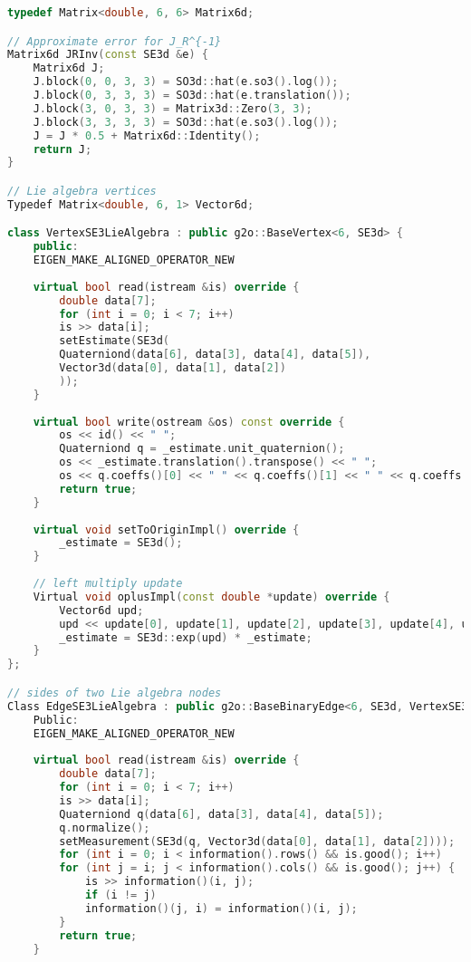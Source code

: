 \clearpage
\begin{lstlisting}[language=c++,caption=slambook2/ch10/pose\_graph\_g2o\_lie\_algebra.cpp（片段）]
typedef Matrix<double, 6, 6> Matrix6d;

// Approximate error for J_R^{-1}
Matrix6d JRInv(const SE3d &e) {
    Matrix6d J;
    J.block(0, 0, 3, 3) = SO3d::hat(e.so3().log());
    J.block(0, 3, 3, 3) = SO3d::hat(e.translation());
    J.block(3, 0, 3, 3) = Matrix3d::Zero(3, 3);
    J.block(3, 3, 3, 3) = SO3d::hat(e.so3().log());
    J = J * 0.5 + Matrix6d::Identity();
    return J;
}

// Lie algebra vertices
Typedef Matrix<double, 6, 1> Vector6d;

class VertexSE3LieAlgebra : public g2o::BaseVertex<6, SE3d> {
    public:
    EIGEN_MAKE_ALIGNED_OPERATOR_NEW
    
    virtual bool read(istream &is) override {
        double data[7];
        for (int i = 0; i < 7; i++)
        is >> data[i];
        setEstimate(SE3d(
        Quaterniond(data[6], data[3], data[4], data[5]),
        Vector3d(data[0], data[1], data[2])
        ));
    }
    
    virtual bool write(ostream &os) const override {
        os << id() << " ";
        Quaterniond q = _estimate.unit_quaternion();
        os << _estimate.translation().transpose() << " ";
        os << q.coeffs()[0] << " " << q.coeffs()[1] << " " << q.coeffs()[2] << " " << q.coeffs()[3] << endl;
        return true;
    }
    
    virtual void setToOriginImpl() override {
        _estimate = SE3d();
    }
    
    // left multiply update
    Virtual void oplusImpl(const double *update) override {
        Vector6d upd;
        upd << update[0], update[1], update[2], update[3], update[4], update[5];
        _estimate = SE3d::exp(upd) * _estimate;
    }
};

// sides of two Lie algebra nodes
Class EdgeSE3LieAlgebra : public g2o::BaseBinaryEdge<6, SE3d, VertexSE3LieAlgebra, VertexSE3LieAlgebra> {
    Public:
    EIGEN_MAKE_ALIGNED_OPERATOR_NEW
    
    virtual bool read(istream &is) override {
        double data[7];
        for (int i = 0; i < 7; i++)
        is >> data[i];
        Quaterniond q(data[6], data[3], data[4], data[5]);
        q.normalize();
        setMeasurement(SE3d(q, Vector3d(data[0], data[1], data[2])));
        for (int i = 0; i < information().rows() && is.good(); i++)
        for (int j = i; j < information().cols() && is.good(); j++) {
            is >> information()(i, j);
            if (i != j)
            information()(j, i) = information()(i, j);
        }
        return true;
    }
    

\end{lstlisting}
